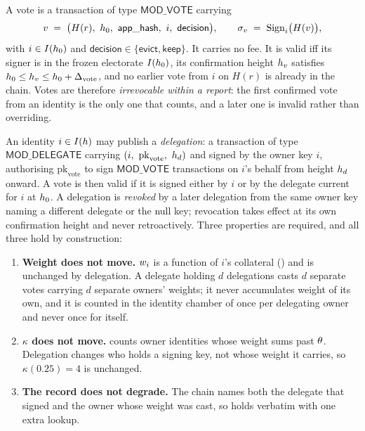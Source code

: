 \begin{definition}
\label{def:23:vote}
A vote is a \fluxd{} transaction of type $\mathsf{MOD\_VOTE}$ carrying
\[
v \;=\; \bigl(H(r),\ \hgt_0,\ \mathsf{app\_hash},\ i,\ \mathsf{decision}\bigr),
\qquad
\sigma_v \;=\; \mathrm{Sign}_{i}\bigl(H(v)\bigr),
\]
with $i \in I(h_0)$ and $\mathsf{decision} \in \{\mathsf{evict}, \mathsf{keep}\}$. It carries no
fee. It is valid iff its signer is in the frozen electorate $I(h_0)$, its confirmation height
$h_v$ satisfies $h_0 \le h_v \le h_0 + \Delta_{\mathrm{vote}}$, and no earlier vote
from $i$ on $H(r)$ is already in the chain. Votes are therefore \emph{irrevocable within a report}:
the first confirmed vote from an identity is the only one that counts, and a later one is invalid
rather than overriding.
\end{definition}

\begin{definition}
\label{def:23:delegation}
An identity $i \in I(h)$ may publish a \emph{delegation}: a \fluxd{} transaction of type
$\mathsf{MOD\_DELEGATE}$ carrying $(i,\ \mathrm{pk}_{\mathrm{vote}},\ \hgt_d)$ and signed by the
owner key $i$, authorising $\mathrm{pk}_{\mathrm{vote}}$ to sign $\mathsf{MOD\_VOTE}$ transactions on
$i$'s behalf from height $h_d$ onward. A vote is then valid if it is signed either by $i$ or by
the delegate current for $i$ at $h_0$. A delegation is \emph{revoked} by a later delegation from
the same owner key naming a different delegate or the null key; revocation takes effect at its own
confirmation height and never retroactively. Three properties are required, and all three hold by
construction:
\begin{enumerate}
  \item \textbf{Weight does not move.} $w_{i}$ is a function of $i$'s collateral
  () and is unchanged by delegation. A delegate holding $d$ delegations casts
  $d$ separate votes carrying $d$ separate owners' weights; it never accumulates weight of its own,
  and it is counted in the identity chamber of  once per delegating owner and
  never once for itself.
  \item \textbf{$\kappa$ does not move.}  counts owner identities whose weight
  sums past $\theta$. Delegation changes who holds a signing key, not whose weight it carries, so
  $\kappa(0.25) = 4$ is unchanged.
  \item \textbf{The record does not degrade.} The chain names both the delegate that signed and the
  owner whose weight was cast, so  holds verbatim with one extra lookup.
\end{enumerate}
\end{definition}

